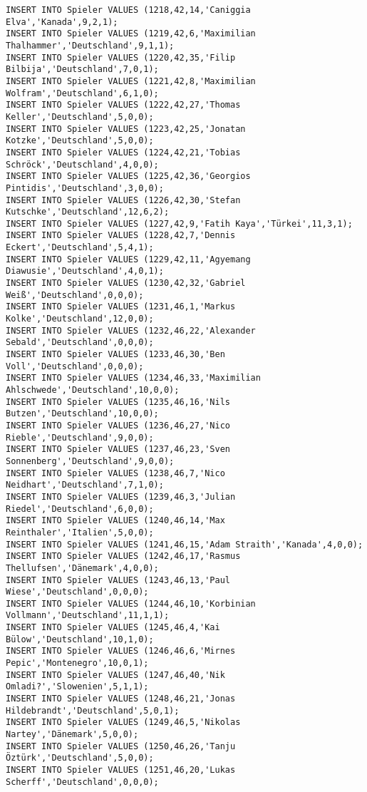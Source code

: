 \documentclass{lehramt-informatik-aufgabe}
\begin{document}
\begin{verbatim}
INSERT INTO Spieler VALUES (1218,42,14,'Caniggia Elva','Kanada',9,2,1);
INSERT INTO Spieler VALUES (1219,42,6,'Maximilian Thalhammer','Deutschland',9,1,1);
INSERT INTO Spieler VALUES (1220,42,35,'Filip Bilbija','Deutschland',7,0,1);
INSERT INTO Spieler VALUES (1221,42,8,'Maximilian Wolfram','Deutschland',6,1,0);
INSERT INTO Spieler VALUES (1222,42,27,'Thomas Keller','Deutschland',5,0,0);
INSERT INTO Spieler VALUES (1223,42,25,'Jonatan Kotzke','Deutschland',5,0,0);
INSERT INTO Spieler VALUES (1224,42,21,'Tobias Schröck','Deutschland',4,0,0);
INSERT INTO Spieler VALUES (1225,42,36,'Georgios Pintidis','Deutschland',3,0,0);
INSERT INTO Spieler VALUES (1226,42,30,'Stefan Kutschke','Deutschland',12,6,2);
INSERT INTO Spieler VALUES (1227,42,9,'Fatih Kaya','Türkei',11,3,1);
INSERT INTO Spieler VALUES (1228,42,7,'Dennis Eckert','Deutschland',5,4,1);
INSERT INTO Spieler VALUES (1229,42,11,'Agyemang Diawusie','Deutschland',4,0,1);
INSERT INTO Spieler VALUES (1230,42,32,'Gabriel Weiß','Deutschland',0,0,0);
INSERT INTO Spieler VALUES (1231,46,1,'Markus Kolke','Deutschland',12,0,0);
INSERT INTO Spieler VALUES (1232,46,22,'Alexander Sebald','Deutschland',0,0,0);
INSERT INTO Spieler VALUES (1233,46,30,'Ben Voll','Deutschland',0,0,0);
INSERT INTO Spieler VALUES (1234,46,33,'Maximilian Ahlschwede','Deutschland',10,0,0);
INSERT INTO Spieler VALUES (1235,46,16,'Nils Butzen','Deutschland',10,0,0);
INSERT INTO Spieler VALUES (1236,46,27,'Nico Rieble','Deutschland',9,0,0);
INSERT INTO Spieler VALUES (1237,46,23,'Sven Sonnenberg','Deutschland',9,0,0);
INSERT INTO Spieler VALUES (1238,46,7,'Nico Neidhart','Deutschland',7,1,0);
INSERT INTO Spieler VALUES (1239,46,3,'Julian Riedel','Deutschland',6,0,0);
INSERT INTO Spieler VALUES (1240,46,14,'Max Reinthaler','Italien',5,0,0);
INSERT INTO Spieler VALUES (1241,46,15,'Adam Straith','Kanada',4,0,0);
INSERT INTO Spieler VALUES (1242,46,17,'Rasmus Thellufsen','Dänemark',4,0,0);
INSERT INTO Spieler VALUES (1243,46,13,'Paul Wiese','Deutschland',0,0,0);
INSERT INTO Spieler VALUES (1244,46,10,'Korbinian Vollmann','Deutschland',11,1,1);
INSERT INTO Spieler VALUES (1245,46,4,'Kai Bülow','Deutschland',10,1,0);
INSERT INTO Spieler VALUES (1246,46,6,'Mirnes Pepic','Montenegro',10,0,1);
INSERT INTO Spieler VALUES (1247,46,40,'Nik Omladi?','Slowenien',5,1,1);
INSERT INTO Spieler VALUES (1248,46,21,'Jonas Hildebrandt','Deutschland',5,0,1);
INSERT INTO Spieler VALUES (1249,46,5,'Nikolas Nartey','Dänemark',5,0,0);
INSERT INTO Spieler VALUES (1250,46,26,'Tanju Öztürk','Deutschland',5,0,0);
INSERT INTO Spieler VALUES (1251,46,20,'Lukas Scherff','Deutschland',0,0,0);

\end{verbatim}
\end{document}
